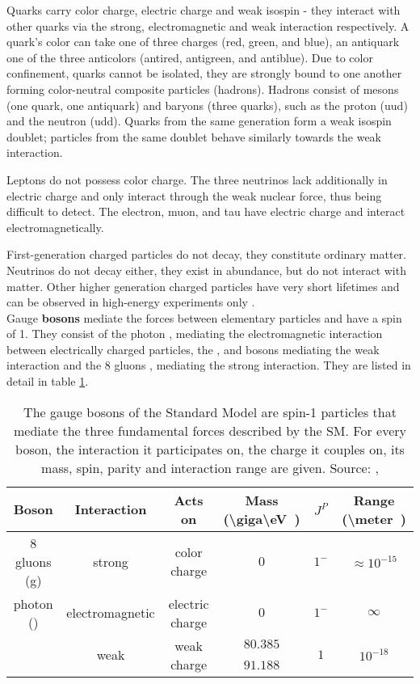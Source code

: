 Quarks carry color charge, electric charge and weak isospin - they interact with other quarks via the strong, electromagnetic and weak interaction respectively. A quark's color can take one of three charges (red, green, and blue), an antiquark one of the three anticolors (antired, antigreen, and antiblue). Due to color confinement, quarks cannot be isolated, they are strongly bound to one another forming color-neutral composite particles (hadrons). Hadrons consist of mesons (one quark, one antiquark) and baryons (three quarks), such as the proton (uud) and the neutron (udd). Quarks from the same generation form a weak isospin doublet; particles from the same doublet behave similarly towards the weak interaction.

Leptons do not possess color charge. The three neutrinos lack additionally in electric charge and only interact through the weak nuclear force, thus being difficult to detect. The electron, muon, and tau have electric charge and interact electromagnetically.

First-generation charged particles do not decay, they constitute ordinary matter. Neutrinos do not decay either, they exist in abundance, but do not interact with matter. Other higher generation charged particles have very short lifetimes and can be observed in high-energy experiments only \cite{wiki:standardmodel}.\\

Gauge \textbf{bosons} mediate the forces between elementary particles and have a spin of 1. They consist of the photon \Pgg, mediating the electromagnetic interaction between electrically charged particles, the \PWp, \PWm and \PZ bosons mediating the weak interaction and the 8 gluons \Pgluon, mediating the strong interaction. They are listed in detail in table \ref{tab:ch_1_sm_bosons}.\\

\begin{table}[h]
	\caption[Gauge bosons of the Standard Model]{The gauge bosons of the Standard Model are spin-1 particles that mediate the three fundamental forces described by the SM. For every boson, the interaction it participates on, the charge it couples on, its mass, spin, parity and interaction range are given. Source: \cite{povh}, \cite{faltermann}}
	\label{tab:ch_1_sm_bosons}
	\begin{tabular}{cccccc}
		\toprule
		Boson & Interaction & Acts on & Mass (\SI[parse-numbers = false]{\giga\eV}) & {$J^P$} & Range (\SI[parse-numbers = false]{\meter})\\
		\midrule
		8 gluons (g) & strong & color charge & {$0$} & {$1^-$} & $\approx 10^{-15}$\\
		photon (\Pphoton) & electromagnetic & electric charge & {$0$} & {$1^-$} & {$\infty$}\\
		\PWpm & \multirow{2}{*}{weak} &\multirow{2}{*}{weak charge} & {$80.385$} & \multirow{2}{*}{$1$} & \multirow{2}{*}{$10^{-18}$}\\
		\PZz & & & {$91.188$} & &\\
		\bottomrule
	\end{tabular}
\end{table}

